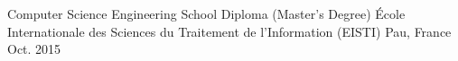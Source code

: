 \begin{cventries}
  \cventry
  {Computer Science Engineering School Diploma (Master's Degree)}
  {École Internationale des Sciences du Traitement de l'Information (EISTI)}
  {Pau, France}
  {Oct. 2015}
  {}
\end{cventries}
